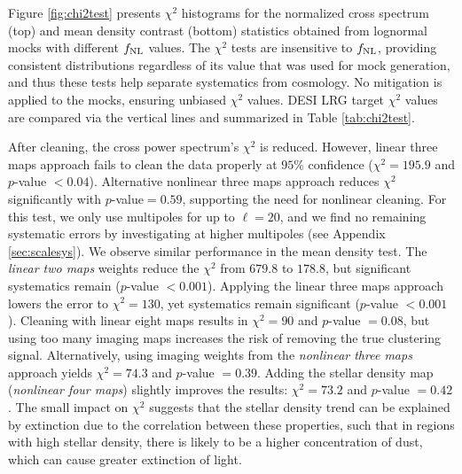 Figure \ref{fig:chi2test} presents $\chi^{2}$ histograms for the normalized cross spectrum (top) and mean density contrast (bottom) statistics obtained from lognormal mocks with different $f_{\rm NL}$ values. The $\chi^{2}$ tests are insensitive to $f_{\rm NL}$, providing consistent distributions regardless of its value that was used for mock generation, and thus these tests help separate systematics from cosmology. No mitigation is applied to the mocks, ensuring unbiased $\chi^{2}$ values. DESI LRG target $\chi^{2}$ values are compared via the vertical lines and summarized in Table \ref{tab:chi2test}.

After cleaning, the cross power spectrum's $\chi^{2}$ is reduced. However, linear three maps approach fails to clean the data properly at $95\%$ confidence ($\chi^{2}=195.9$ and $p$-value $< 0.04$). Alternative nonlinear three maps approach reduces $\chi^{2}$ significantly with $p$-value$=0.59$, supporting the need for nonlinear cleaning. For this test, we only use multipoles for up to $\ell=20$, and we find no remaining systematic errors by investigating at higher multipoles (see Appendix \ref{sec:scalesys}). We observe similar performance in the mean density test. The \textit{linear two maps} weights reduce the $\chi^{2}$ from $679.8$ to $178.8$, but significant systematics remain ($p$-value $<0.001$). Applying the linear three maps approach lowers the error to $\chi^{2}=130$, yet systematics remain significant ($p$-value $<0.001$). Cleaning with linear eight maps results in $\chi^{2}=90$ and $p$-value $=0.08$, but using too many imaging maps increases the risk of removing the true clustering signal. Alternatively, using imaging weights from the \textit{nonlinear three maps} approach yields $\chi^{2}=74.3$ and $p$-value $=0.39$. Adding the stellar density map (\textit{nonlinear four maps}) slightly improves the results: $\chi^{2}=73.2$ and $p$-value $=0.42$. The small impact on $\chi^{2}$ suggests that the stellar density trend can be explained by extinction due to the correlation between these properties, such that in regions with high stellar density, there is likely to be a higher concentration of dust, which can cause greater extinction of light. 

